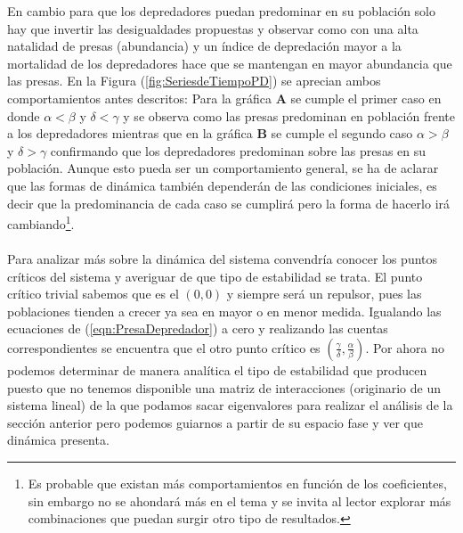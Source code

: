 En cambio para que los depredadores puedan predominar en su población solo hay que invertir las desigualdades propuestas y observar como con una alta natalidad de presas (abundancia) y un índice de depredación mayor a la mortalidad de los depredadores hace que se mantengan en mayor abundancia que las presas. En la Figura (\ref{fig:SeriesdeTiempoPD}) se aprecian ambos comportamientos antes descritos: Para la gráfica \textbf{A} se cumple el primer caso en donde $\alpha<\beta$ y $\delta<\gamma$ y se observa como las presas predominan en población frente a los depredadores mientras que en la gráfica \textbf{B} se cumple el segundo caso $\alpha>\beta$ y $\delta>\gamma$ confirmando que los depredadores predominan sobre las presas en su población. Aunque esto pueda ser un comportamiento general, se ha de aclarar que las formas de dinámica también dependerán de las condiciones iniciales, es decir que la predominancia de cada caso se cumplirá pero la forma de hacerlo irá cambiando\footnote{Es probable que existan más comportamientos en función de los coeficientes, sin embargo no se ahondará más en el tema y se invita al lector explorar más combinaciones que puedan surgir otro tipo de resultados.}.\\
\\
Para analizar más sobre la dinámica del sistema convendría conocer los puntos críticos del sistema y averiguar de que tipo de estabilidad se trata. El punto crítico trivial sabemos que es el $(0,0)$ y siempre será un repulsor, pues las poblaciones tienden a crecer ya sea en mayor o en menor medida. Igualando las ecuaciones de (\ref{eqn:PresaDepredador}) a cero y realizando las cuentas correspondientes se encuentra que el otro punto crítico es $(\frac{\gamma}{\delta},\frac{\alpha}{\beta})$. Por ahora no podemos determinar de manera analítica el tipo de estabilidad que producen puesto que no tenemos disponible una matriz de interacciones (originario de un sistema lineal) de la que podamos sacar eigenvalores para realizar el análisis de la sección anterior pero podemos guiarnos a partir de su espacio fase y ver que dinámica presenta.
